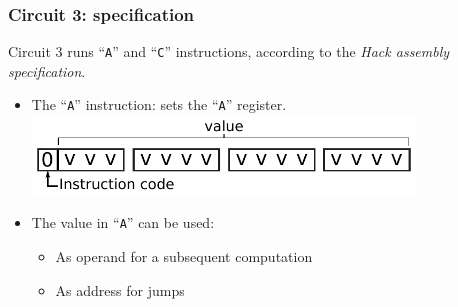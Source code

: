         \begin{frame}
            \frametitle{Circuit 3: specification}

            \par{Circuit 3 runs ``\texttt{A}'' and ``\texttt{C}'' instructions,
            according to the \emph{Hack assembly specification}.}

            \begin{itemize}
                \item The ``\texttt{A}'' instruction: sets the ``\texttt{A}'' register.
                    \includegraphics[width=0.8\textwidth]{imgs/cpu-instruction-a.pdf}
                \vspace{0.5cm}
                \item The value in ``\texttt{A}'' can be used:
                    \begin{itemize}
                        \item As operand for a subsequent computation
                        \item As address for jumps
                    \end{itemize}
            \end{itemize}
        \end{frame}

